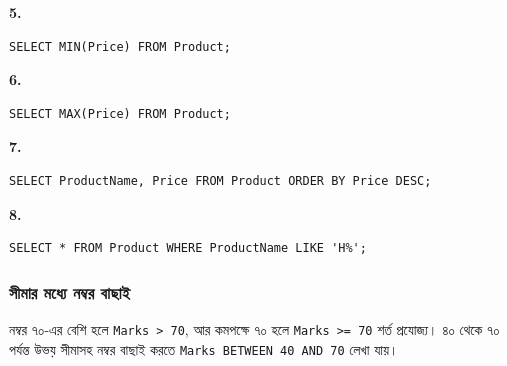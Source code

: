\begin{chSixSideBySide}[.48]
\par\noindent\begin{minipage}{\linewidth}\textbf{5.}\par
\begin{verbatim}
SELECT MIN(Price) FROM Product;
\end{verbatim}
\end{minipage}\par
\chSixNextColumn
\par\noindent\begin{minipage}{\linewidth}\textbf{6.}\par
\begin{verbatim}
SELECT MAX(Price) FROM Product;
\end{verbatim}
\end{minipage}\par
\end{chSixSideBySide}
\begin{chSixSideBySide}[.48]
\par\noindent\begin{minipage}{\linewidth}\textbf{7.}\par
\begin{verbatim}
SELECT ProductName, Price FROM Product ORDER BY Price DESC;
\end{verbatim}
\end{minipage}\par
\chSixNextColumn
\par\noindent\begin{minipage}{\linewidth}\textbf{8.}\par
\begin{verbatim}
SELECT * FROM Product WHERE ProductName LIKE 'H%';
\end{verbatim}
\end{minipage}\par
\end{chSixSideBySide}


\subsubsection{সীমার মধ্যে নম্বর বাছাই}
নম্বর ৭০-এর বেশি হলে \texttt{Marks > 70}, আর কমপক্ষে ৭০ হলে \texttt{Marks >= 70} শর্ত প্রযোজ্য। ৪০ থেকে ৭০ পর্যন্ত উভয় সীমাসহ নম্বর বাছাই করতে \texttt{Marks BETWEEN 40 AND 70} লেখা যায়।


